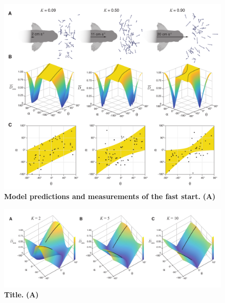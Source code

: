 \documentclass[12pt]{article}
\begin{document}
\pagebreak
\begin{figure}[t]
\begin{centering}
\includegraphics[width=1\textwidth]{Fig_03.pdf}
\centering	
\caption{\textbf{Model predictions and measurements of the fast start.}
\textbf{(A)}  }
\label{our_topo}
\end{centering}
\end{figure}


\pagebreak
\begin{figure}[t] 
\begin{centering}
\includegraphics[width=1.1\textwidth]{Fig_04.pdf}
\centering	
\caption{\textbf{Title.} \textbf{(A)}  }
\label{k>1_topo}
\end{centering}
\end{figure}






\end{document}
